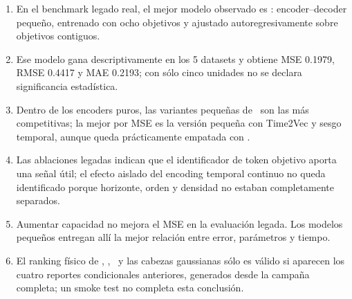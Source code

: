 \begin{enumerate}
	\item En el benchmark legado real, el mejor modelo observado es : encoder--decoder pequeño, entrenado con ocho objetivos y ajustado autoregresivamente sobre objetivos contiguos.
	\item Ese modelo gana descriptivamente en los 5 datasets y obtiene MSE 0.1979, RMSE 0.4417 y MAE 0.2193; con sólo cinco unidades no se declara significancia estadística.
	\item Dentro de los encoders puros, las variantes pequeñas de \CTTransformer\ son las más competitivas; la mejor por MSE es la versión pequeña con Time2Vec y sesgo temporal, aunque queda prácticamente empatada con \CTTransformerSmall.
	\item Las ablaciones legadas indican que el identificador de token objetivo aporta una señal útil; el efecto aislado del encoding temporal continuo no queda identificado porque horizonte, orden y densidad no estaban completamente separados.
	\item Aumentar capacidad no mejora el MSE en la evaluación legada. Los modelos pequeños entregan allí la mejor relación entre error, parámetros y tiempo.
	\item El ranking físico de \QueryCross, \ContinuousBasis, \CTSSM\ y las cabezas gaussianas sólo es válido si aparecen los cuatro reportes condicionales anteriores, generados desde la campaña completa; un smoke test no completa esta conclusión.
\end{enumerate}
